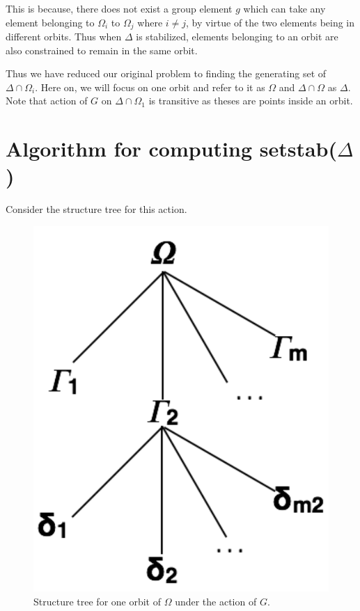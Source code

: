This is because, there does not exist a group element $g$ which can take any element belonging to $\Omega_{i}$ to $\Omega_{j}$ where $i \neq j$, by virtue of the two elements being in different orbits. Thus when $\Delta$ is stabilized, elements belonging to an orbit are also constrained to remain in the same orbit.

Thus we have reduced our original problem to finding the generating set of $\Delta\cap\Omega_{i}$. Here on, we will focus on one orbit and refer to it as $\Omega$ and $\Delta\cap\Omega$ as $\Delta$. Note that action of $G$ on $\Delta \cap \Omega_1$ is transitive as theses are points inside an orbit.

\section{Algorithm for computing setstab($\Delta$)}
Consider the structure tree for this action.
\begin{figure}[htp!]
	\centering
	\includegraphics[scale=0.3]{images/setstabalg.pdf}
	\caption{Structure tree for one orbit of $\Omega$ under the action of $G$.}
	\label{fig:structurestree}
\end{figure}

